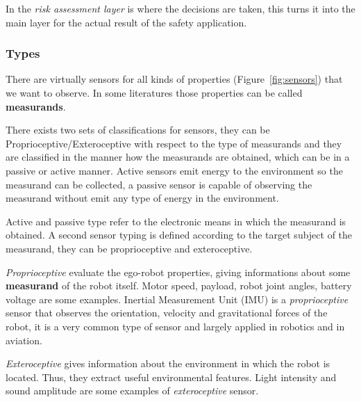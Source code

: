 In the \textit{risk assessment layer} is where the decisions are taken, this turns it into the main layer for the actual result of the safety application.

\subsubsection{Types}

There are virtually sensors for all kinds of properties (Figure~\ref{fig:sensors}) that we want to observe. In some literatures those properties can be called \textbf{measurands}\cite{riener2010sensor}. 

There exists two sets of classifications for sensors, they can be Proprioceptive/Exteroceptive with respect to the type of measurands \cite{iyengar1991autonomous} and they are classified in the manner how the measurands are obtained, which can be in a passive or active \cite{Hebert_2000_3595} manner. Active sensors emit energy to the environment so the measurand can be collected, a passive sensor is capable of observing the measurand without emit any type of energy in the environment.

Active and passive type refer to the electronic means in which the measurand is obtained. A second sensor typing is defined according to the target subject of the measurand, they can be proprioceptive and exteroceptive.

\textit{Proprioceptive} evaluate the ego-robot properties, giving informations about some \textbf{measurand} of the robot itself. Motor speed, payload, robot joint angles, battery voltage are some examples.  Inertial Measurement Unit (IMU) is a \textit{proprioceptive} sensor that observes the orientation, velocity and gravitational forces of the robot, it is a very common type of sensor and largely applied in robotics and in aviation.

\textit{Exteroceptive} gives information about the environment in which the robot is located. Thus, they extract useful environmental features. Light intensity and sound amplitude are some examples of \textit{exteroceptive} sensor.

